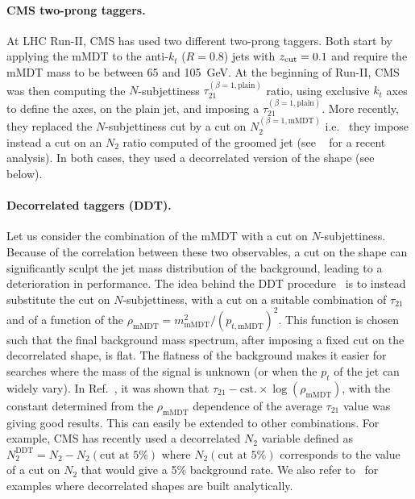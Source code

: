 \paragraph{CMS two-prong taggers.}  At LHC Run-II, CMS has used
  two different two-prong taggers. Both start by applying the mMDT to
  the anti-$k_t$ ($R=0.8$) jets with $z_{\text{cut}}=0.1$ and require the mMDT
  mass to be between 65 and 105~GeV.
  At the beginning of Run-II, CMS was then computing the
  $N$-subjettiness $\tau_{21}^{(\beta=1,\text{plain})}$ ratio, using
  exclusive $k_t$ axes to define the axes, on the plain
  jet, and imposing a $\tau_{21}^{(\beta=1,\text{plain})}$.
  More recently, they replaced the $N$-subjettiness cut by a cut on
  $N_2^{(\beta=1,\text{mMDT})}$ i.e. \ they impose instead a cut on an
  $N_2$ ratio computed of the groomed jet (see
  \eg~\cite{Sirunyan:2018ikr} for a recent analysis).
  In both cases, they used a decorrelated version of the shape (see
  below).
  
  \paragraph{Decorrelated taggers (DDT).} Let us consider the
  combination of the mMDT with a cut on $N$-subjettiness.
Because of the correlation between these two observables, a cut on the shape can significantly sculpt the jet mass distribution of the background, leading to a deterioration in performance. 
%
  The idea behind the DDT procedure~\cite{Dolen:2016kst} is to instead substitute the cut on $N$-subjettiness, with a cut on a suitable
  combination of $\tau_{21}$ and of a function of the
  $\rho_{\text{mMDT}}=m^2_{\text{mMDT}}/(p_{t,\text{mMDT}})^2$.
This function is chosen such that
  the final background mass spectrum, after imposing a fixed cut on the
  decorrelated shape, is flat. The flatness of the background makes it
  easier for searches where the mass of the signal is unknown (or when
  the $p_t$ of the jet can widely vary).
  In Ref.~\cite{Dolen:2016kst}, it was shown that
  $\tau_{21}-\text{cst.}\times\log(\rho_{\text{mMDT}})$, with the
  constant determined from the $\rho_{\text{mMDT}}$ dependence of the
  average $\tau_{21}$ value was giving good results.
  This can easily be extended to other combinations. For example, CMS
  has recently used a decorrelated $N_2$ variable defined as
  $N_2^{\text{DDT}}=N_2-N_2(\text{cut at }5\%)$ where $N_2(\text{cut at
  }5\%)$ corresponds to the value of a cut on $N_2$ that would give a
  5\% background rate.
  We also refer to~\cite{Moult:2017okx,Napoletano:2018ohv} for
  examples where decorrelated shapes are built analytically.
  
